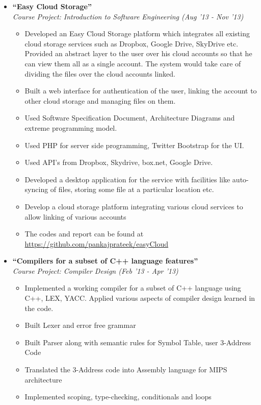 \documentclass[margin,line]{resume}
\begin{document}
\begin{resume}
  \begin{itemize}

  \item \large{\textbf{\textsf{``Easy Cloud Storage''}}}
    \\ \small{\textit{Course Project: Introduction to Software Engineering (Aug '13 - Nov '13)}}
    \normalsize
    \begin{itemize}
    \item Developed an Easy Cloud Storage platform which integrates all existing cloud storage services such as Dropbox, Google Drive, SkyDrive etc. Provided an abstract layer to the user over his cloud accounts so that he can view them all as a single account. The system would take care of dividing the files over the cloud accounts linked.
    \item Built a web interface for authentication of the user, linking the account to other cloud storage and managing files on them.
    \item Used Software Specification Document, Architecture Diagrams and extreme programming model.
    \item Used PHP for server side programming, Twitter Bootstrap for the UI.
    \item Used API's from Dropbox, Skydrive, box.net, Google Drive.
    \item Developed a desktop application for the service with facilities like auto-syncing of files, storing some file at a particular location etc.
    \item Develop a cloud storage platform integrating various cloud services to allow linking of various accounts
    \item The codes and report can be found at \url{https://github.com/pankajprateek/easyCloud}
    \end{itemize}

  \item \large{\textbf{\textsf{``Compilers for a subset of C++ language features''}}}
    \\ \small{\textit{Course Project: Compiler Design (Feb '13 - Apr '13)}}
    \normalsize
    \begin{itemize}
    \item Implemented a working compiler for a subset of C++ language using C++, LEX, YACC. Applied various aspects of compiler design learned in the code.
    \item Built Lexer and error free grammar
    \item Built Parser along with semantic rules for Symbol Table, user 3-Address Code
    \item Translated the 3-Address code into Assembly language for MIPS architecture
    \item Implemented scoping, type-checking, conditionals and loops
    \end{itemize}


\end{itemize}
\end{resume}
\end{document}
